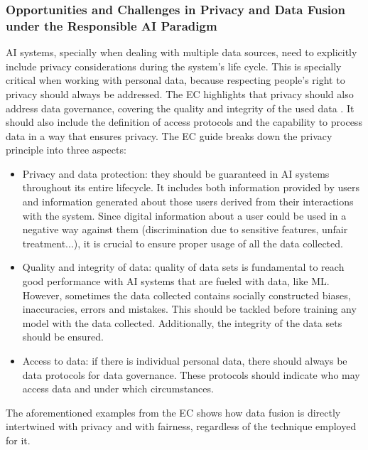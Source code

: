 \documentclass[final]{elsarticle}
\begin{document}
\subsubsection{Opportunities and Challenges in Privacy and Data Fusion under the Responsible AI Paradigm} \label{sssec:opportunities_data_fusion}

AI systems, specially when dealing with multiple data sources, need to explicitly include privacy considerations during the system's life cycle. This is specially critical when working with personal data, because respecting people's right to privacy should always be addressed. The EC highlights that privacy should also address data governance, covering the quality and integrity of the used data \cite{hleg2019high}. It should also include the definition of access protocols and the capability to process data in a way that ensures privacy. The EC guide breaks down the privacy principle into three aspects:
\begin{itemize}[leftmargin=*]
\item Privacy and data protection: they should be guaranteed in AI systems throughout its entire lifecycle. It includes both information provided by users and information generated about those users derived from their interactions with the system. Since digital information about a user could be used in a negative way against them (discrimination due to sensitive features, unfair treatment...), it is crucial to ensure proper usage of all the data collected.

\item Quality and integrity of data: quality of data sets is fundamental to reach good performance with AI systems that are fueled with data, like ML. However, sometimes the data collected contains socially constructed biases, inaccuracies, errors and mistakes. This should be tackled before training any model with the data collected. Additionally, the integrity of the data sets should be ensured. 

\item Access to data: if there is individual personal data, there should always be data protocols for data governance. These protocols should indicate who may access data and under which circumstances. 
\end{itemize}

The aforementioned examples from the EC shows how data fusion is directly intertwined with privacy and with fairness, regardless of the technique employed for it. 
\end{document}
